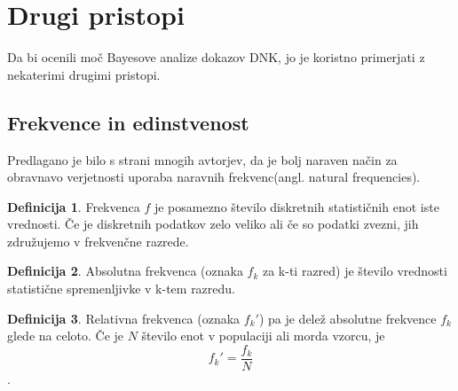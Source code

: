 \documentclass[12pt,a4paper]{amsart}
\theoremstyle{definition} %
\newtheorem{definicija}{Definicija}[section]
\theoremstyle{plain} %
\begin{document}
\section{Drugi pristopi}
Da bi ocenili moč Bayesove analize dokazov DNK, jo je koristno primerjati z nekaterimi drugimi pristopi. \\

\subsection{Frekvence in edinstvenost}
Predlagano je bilo s strani mnogih avtorjev, da je bolj naraven način za obravnavo verjetnosti uporaba naravnih frekvenc(angl. natural 
frequencies). 
\begin{definicija}
    Frekvenca $f$ je posamezno število diskretnih statističnih enot iste vrednosti. Če je diskretnih podatkov zelo veliko ali če so podatki zvezni, jih združujemo v frekvenčne razrede.
\end{definicija}

\begin{definicija}
    Absolutna frekvenca (oznaka $f_k$ za k-ti razred) je število vrednosti statistične spremenljivke v k-tem razredu.
\end{definicija}

\begin{definicija}
    Relativna frekvenca (oznaka $f_k'$) pa je delež absolutne frekvence $f_k$ glede na celoto. Če je $N$ število enot v populaciji ali morda vzorcu, je \[f_k' = \frac{f_k}{N}\].
\end{definicija}
\end{document}
